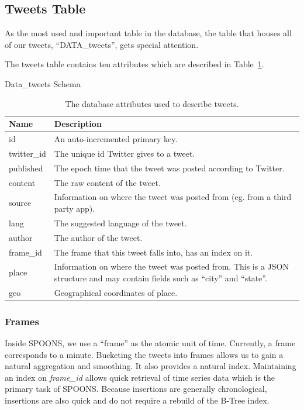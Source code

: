 \documentclass[12pt]{ucthesis}
\begin{document}
\subsection{Tweets Table}
\label{arch-database-tables-tweets}
As the most used and important table in the database, the table that houses all of our tweets, ``DATA\_tweets'', gets special attention.

The tweets table contains ten attributes which are described in Table~\ref{table:tweet-attributes}.

\begin{table}
   \begin{center}
      {\Large Data\_tweets Schema}
      \begin{tabular}{|l|p{12cm}|}
         \hline
            Name & Description
         \tabularnewline\hline
            \textsf{id} & An auto-incremented primary key.
         \tabularnewline\hline
            \textsf{twitter\_id} & The unique id Twitter gives to a tweet.
         \tabularnewline\hline
            \textsf{published} & The epoch time that the tweet was posted according to Twitter.
         \tabularnewline\hline
            \textsf{content} & The raw content of the tweet.
         \tabularnewline\hline
            \textsf{source} & Information on where the tweet was posted from (eg. from a third party app).
         \tabularnewline\hline
            \textsf{lang} & The suggested language of the tweet.
         \tabularnewline\hline
            \textsf{author} & The author of the tweet.
         \tabularnewline\hline
            \textsf{frame\_id} & The frame that this tweet falls into, has an index on it.
         \tabularnewline\hline
            \textsf{place} & Information on where the tweet was posted from. This is a JSON structure and may contain fields such as ``city'' and ``state''.
         \tabularnewline\hline
            \textsf{geo} & Geographical coordinates of place.
         \tabularnewline\hline
      \end{tabular}
   \end{center}
   \caption[Database Tweet Attributes]{The database attributes used to describe tweets.}
   \label{table:tweet-attributes}
\end{table}

\subsubsection{Frames}
Inside SPOONS, we use a ``frame'' as the atomic unit of time. Currently, a frame corresponds to a minute. Bucketing the tweets into frames allows us to
gain a natural aggregation and smoothing. It also provides a natural index. Maintaining an index on \textit{frame\_id} allows quick retrieval of
time series data which is the primary task of SPOONS. Because insertions are generally chronological, insertions are also quick and do not require a
rebuild of the B-Tree index\cite{innodb}.
\end{document}
